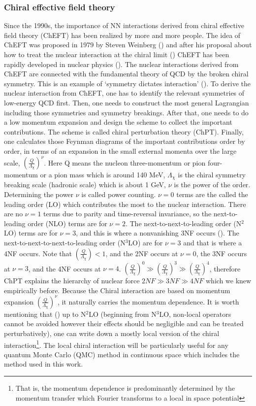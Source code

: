 \documentclass[12pt,letterpaper,UTF8]{report}
\begin{document}
\subsubsection{Chiral effective field theory}

Since the 1990s, the importance of NN interactions derived from chiral effective field theory (ChEFT) has been realized by more and more people.
The idea of ChEFT was proposed in 1979 by Steven Weinberg (\cite{WEINBERG1979327}) and after his proposal about how to treat the nuclear interaction at the chiral limit (\cite{WEINBERG1990288,WEINBERG19913}) ChEFT has been rapidly developed in nuclear physics (\cite{Epelbaum2009a,MACHLEIDT20111}). The nuclear interactions derived from ChEFT are connected with the fundamental theory of QCD by the broken chiral symmetry. This is an example of `symmetry dictates interaction' (\cite{Yang1980a}).
To derive the nuclear interaction from ChEFT, one has to identify the relevant symmetries of low-energy QCD first.
Then, one needs to construct the most general Lagrangian including those symmetries and symmetry breakings.
After that, one needs to do a low momentum expansion and design the scheme to collect the important contributions. The scheme is called chiral perturbation theory (ChPT).
Finally, one calculates those Feynman diagrams of the important contributions order by order, in terms of an expansion in the small external momenta over the large scale, $(\frac{Q}{\Lambda_{\chi}})^\nu$. Here Q means the nucleon three-momentum or pion four-momentum or a pion mass which is around 140 MeV, $\Lambda_\chi$ is the chiral symmetry breaking scale (hadronic scale) which is about 1 GeV, $\nu$ is the power of the order.
Determining the power $\nu$ is called power counting.
$\nu=0$ terms are the called the leading order (LO) which contributes the most to the nuclear interaction.
There are no $\nu=1$ terms due to parity and time-reversal invariance, so the next-to-leading order (NLO) terms are for $\nu=2$.
The next-to-next-to-leading order (N$^2$LO) terms are for $\nu=3$, and this is where a nonvanishing 3NF occurs (\cite{Klock1994a,Epelbaum2002PRC}). The next-to-next-to-next-to-leading order (N$^3$LO) are for $\nu=3$ and that is where a 4NF occurs.
Note that $(\frac{Q}{\Lambda_{\chi}})<1$, and the 2NF occurs at $\nu=0$, the 3NF occurs at $\nu=3$, and the 4NF occurs at $\nu=4$. $(\frac{Q}{\Lambda_{\chi}})^0 \gg (\frac{Q}{\Lambda_{\chi}})^3 \gg (\frac{Q}{\Lambda_{\chi}})^4$, therefore ChPT explains the hierarchy of nuclear force $2NF \gg 3NF \gg 4NF$ which we knew empirically before.
Because the Chiral interaction are based on momentum expansion $(\frac{Q}{\Lambda_{\chi}})^\nu$, it naturally carries the momentum dependence.
It is worth mentioning that (\cite{Gerzerlis13a}) up to N$^2$LO (beginning from N$^3$LO, non-local operators cannot be avoided however their effects should be negligible and can be treated perturbatively), one can write down a mostly local version of the chiral interaction\footnote{That is, the momentum dependence is predominantly determined by the momentum transfer which Fourier transforms to a local in space potential}.
The local chiral interaction will be particularly useful for any quantum Monte Carlo (QMC) method in continuous space which includes the method used in this work.
\end{document}
